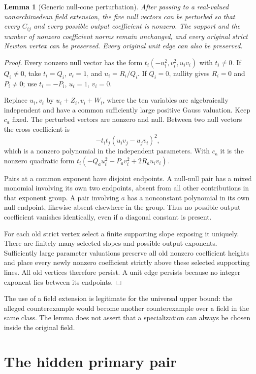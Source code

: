 \documentclass[11pt]{article}
\newtheorem{lemma}[theorem]{Lemma}
\theoremstyle{remark}\newtheorem{remark}[theorem]{Remark}
\begin{document}
\begin{lemma}[Generic null-cone perturbation]\label{lem:perturb}
After passing to a real-valued nonarchimedean field extension, the five
null vectors can be perturbed so that every $C_{ij}$ and every possible
output coefficient is nonzero. The support and the number of nonzero
coefficient norms remain unchanged, and every original strict Newton
vertex can be preserved. Every original unit edge can also be preserved.
\end{lemma}
\begin{proof}
Every nonzero null vector has the form
$t_i(-u_i^2,v_i^2,u_iv_i)$ with $t_i\ne0$. If $Q_i\ne0$, take
$t_i=Q_i$, $v_i=1$, and $u_i=R_i/Q_i$. If $Q_i=0$, nullity gives
$R_i=0$ and $P_i\ne0$; use $t_i=-P_i$, $u_i=1$, $v_i=0$.

Replace $u_i,v_i$ by $u_i+Z_i,v_i+W_i$, where the ten variables are
algebraically independent and have a common sufficiently large positive
Gauss valuation. Keep $c_a$ fixed. The perturbed vectors are nonzero
and null. Between two null vectors the cross coefficient is
\[
 -t_it_j(u_iv_j-u_jv_i)^2,
\]
which is a nonzero polynomial in the independent parameters. With
$c_a$ it is the nonzero quadratic form
$t_i(-Q_a u_i^2+P_a v_i^2+2R_a u_iv_i)$.

Pairs at a common exponent have disjoint endpoints. A null-null pair
has a mixed monomial involving its own two endpoints, absent from all
other contributions in that exponent group. A pair involving $a$ has
a nonconstant polynomial in its own null endpoint, likewise absent
elsewhere in the group. Thus no possible output coefficient vanishes
identically, even if a diagonal constant is present.

For each old strict vertex select a finite supporting slope exposing
it uniquely. There are finitely many selected slopes and possible
output exponents. Sufficiently large parameter valuations preserve
all old nonzero coefficient heights and place every newly nonzero
coefficient strictly above these selected supporting lines. All old
vertices therefore persist. A unit edge persists because no integer
exponent lies between its endpoints.
\end{proof}

The use of a field extension is legitimate for the universal upper
bound: the alleged counterexample would become another counterexample
over a field in the same class. The lemma does not assert that a
specialization can always be chosen inside the original field.

\section{The hidden primary pair}
\end{document}
